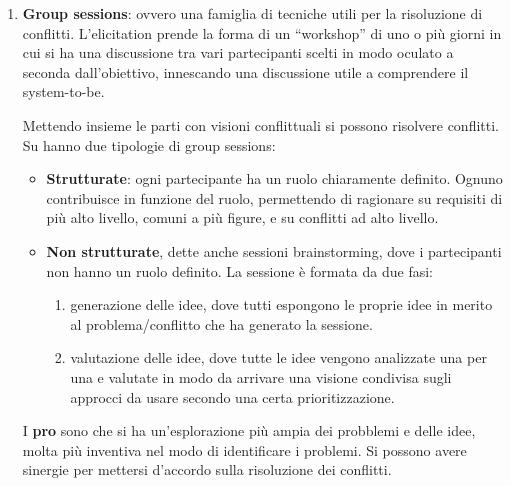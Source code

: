 \begin{itemize}
\begin{enumerate}
                  \item \textbf{Group sessions}: ovvero una famiglia di tecniche utili per
                        la risoluzione di conflitti. L'elicitation prende la forma di un “workshop”
                        di uno o più giorni in cui si ha una discussione tra vari partecipanti
                        scelti in modo oculato a seconda dall'obiettivo, innescando una discussione
                        utile a comprendere il system-to-be.

                        Mettendo insieme le parti con visioni conflittuali si possono risolvere
                        conflitti. Su hanno due tipologie di group sessions:
                        \begin{itemize}
                              \item \textbf{Strutturate}: ogni partecipante ha un ruolo chiaramente
                                    definito. Ognuno contribuisce in funzione del ruolo, permettendo di
                                    ragionare su requisiti di più alto livello, comuni a più figure, e
                                    su conflitti ad alto livello.
                              \item \textbf{Non strutturate}, dette anche sessioni brainstorming,
                                    dove i partecipanti non hanno un ruolo definito. La sessione è
                                    formata da due fasi:
                                    \begin{enumerate}
                                    \item generazione delle idee, dove tutti espongono le proprie
                                          idee in merito al problema/conflitto che ha generato la sessione.
                                    \item valutazione delle idee, dove tutte le idee vengono analizzate
                                          una per una e valutate in modo da arrivare una visione condivisa
                                          sugli approcci da usare secondo una certa prioritizzazione.
                                    \end{enumerate}
                        \end{itemize}

                        I \textbf{pro} sono che si ha un'esplorazione più ampia 
                        dei probblemi e delle idee, molta più inventiva nel modo 
                        di identificare i problemi. Si possono avere sinergie per 
                        mettersi d'accordo sulla risoluzione dei conflitti.


\end{enumerate}
\end{itemize}
